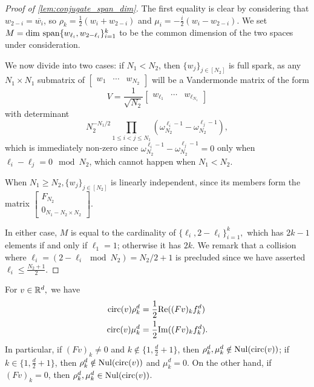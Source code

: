 \begin{proof}[Proof of \cref{lem:conjugate_span_dim}]

The first equality is clear by considering that $w_{2 - i} = \overline{w_i}$, so $\rho_k = \frac{1}{2}(w_i + w_{2-i})$ and $\mu_i = -\frac{i}{2}(w_i - w_{2 - i})$.  We set $M = \dim\,\operatorname{span}\{w_{\ell_i}, w_{2 - \ell_i}\}_{i = 1}^k$ to be the common dimension of the two spaces under consideration.

We now divide into two cases: if $N_1 < N_2$, then $\{w_j\}_{j \in [N_2]}$ is full spark, as any $N_1 \times N_1$ submatrix of $\begin{bmatrix} w_1 & \cdots & w_{N_2} \end{bmatrix}$ will be a Vandermonde matrix of the form \[V = \frac{1}{\sqrt{N_2}}\begin{bmatrix} w_{\ell_1} & \cdots & w_{\ell_{N_1}} \end{bmatrix}\] with determinant \[N_2^{-N_1 / 2}\prod_{1 \le i < j \le N_1} (\omega_{N_2}^{\ell_i - 1} - \omega_{N_2}^{\ell_j - 1}),\] which is immediately non-zero since $\omega_{N_2}^{\ell_i - 1} - \omega_{N_2}^{\ell_j - 1} = 0$ only when $\ell_i - \ell_j = 0 \mod N_2$, which cannot happen when $N_1 < N_2$.

When $N_1 \ge N_2, \{w_j\}_{j \in [N_2]}$ is linearly independent, since its members form the matrix $\begin{bmatrix} F_{N_2} \\ 0_{N_1 - N_2 \times N_2} \end{bmatrix}$.

In either case, $M$ is equal to the cardinality of $\{\ell_i, 2 - \ell_i\}_{i = 1}^k,$ which has $2k - 1$ elements if and only if $\ell_1 = 1$; otherwise it has $2k$.  We remark that a collision where $\ell_i = (2 - \ell_i \mod N_2) = N_2 / 2 + 1$ is precluded since we have asserted $\ell_i \le \frac{N_2 + 1}{2}$.

\end{proof}

\begin{lemma}
  For $v \in \mathbb{R}^d,$ we have \begin{align} \operatorname{circ}(v) \rho_k^d &= \frac{1}{2}\mathrm{Re}((Fv)_k f_k^d) \label{eq:real_part} \\ \operatorname{circ}(v) \mu_k^d &= \frac{1}{2}\mathrm{Im}((Fv)_k f_k^d) \label{eq:imag_part}. \end{align} In particular, if $(Fv)_k \neq 0$ and $k \notin \{1, \frac{d}{2} + 1\}$, then $\rho_k^d, \mu_k^d \notin \operatorname{Nul}(\operatorname{circ}(v))$; if $k \in \{1, \frac{d}{2} + 1\}$, then $\rho_k^d \notin \operatorname{Nul}(\operatorname{circ}(v))$ and $\mu_k^d = 0$.  On the other hand, if $(Fv)_k = 0$, then $\rho_k^d, \mu_k^d \in \operatorname{Nul}(\operatorname{circ}(v))$.  \label{lem:eigenbits}
\end{lemma}

